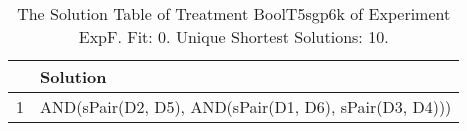 \begin{table}[ht]
\centering
\begin{tabular}{rp{9cm}}
  \hline
 & Solution \\ 
  \hline
1 & AND(sPair(D2, D5), AND(sPair(D1, D6), sPair(D3, D4))) \\ 
   \hline
\end{tabular}
\caption{The Solution Table of Treatment BoolT5sgp6k of Experiment ExpF. Fit: 0. Unique Shortest Solutions: 10.} 
\end{table}
